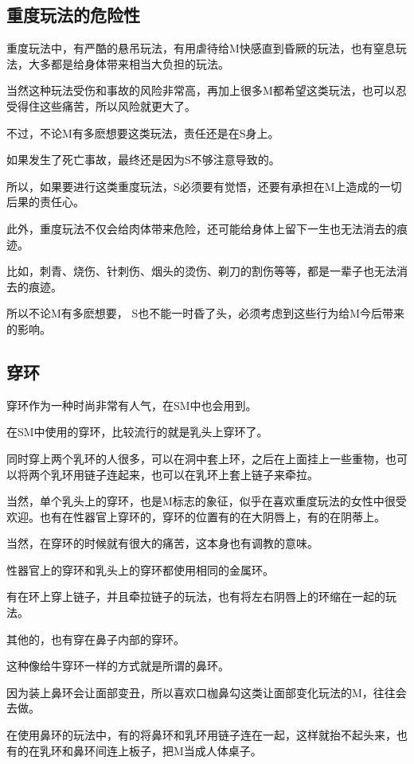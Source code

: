 \documentclass[12pt,UTF8]{ctexbook}
\begin{document}
\subsection{重度玩法的危险性}

重度玩法中，有严酷的悬吊玩法，有用虐待给M快感直到昏厥的玩法，也有窒息玩法，大多都是给身体带来相当大负担的玩法。

当然这种玩法受伤和事故的风险非常高，再加上很多M都希望这类玩法，也可以忍受得住这些痛苦，所以风险就更大了。

不过，不论M有多麽想要这类玩法，责任还是在S身上。

如果发生了死亡事故，最终还是因为S不够注意导致的。

所以，如果要进行这类重度玩法，S必须要有觉悟，还要有承担在M上造成的一切后果的责任心。

此外，重度玩法不仅会给肉体带来危险，还可能给身体上留下一生也无法消去的痕迹。

比如，刺青、烧伤、针刺伤、烟头的烫伤、剃刀的割伤等等，都是一辈子也无法消去的痕迹。

所以不论M有多麽想要， S也不能一时昏了头，必须考虑到这些行为给M今后带来的影响。

\subsection{穿环}

穿环作为一种时尚非常有人气，在SM中也会用到。

在SM中使用的穿环，比较流行的就是乳头上穿环了。

同时穿上两个乳环的人很多，可以在洞中套上环，之后在上面挂上一些重物，也可以将两个乳环用链子连起来，也可以在乳环上套上链子来牵拉。

当然，单个乳头上的穿环，也是M标志的象征，似乎在喜欢重度玩法的女性中很受欢迎。也有在性器官上穿环的，穿环的位置有的在大阴唇上，有的在阴蒂上。

当然，在穿环的时候就有很大的痛苦，这本身也有调教的意味。

性器官上的穿环和乳头上的穿环都使用相同的金属环。

有在环上穿上链子，并且牵拉链子的玩法，也有将左右阴唇上的环缩在一起的玩法。

其他的，也有穿在鼻子内部的穿环。

这种像给牛穿环一样的方式就是所谓的鼻环。

因为装上鼻环会让面部变丑，所以喜欢口枷鼻勾这类让面部变化玩法的M，往往会去做。

在使用鼻环的玩法中，有的将鼻环和乳环用链子连在一起，这样就抬不起头来，也有的在乳环和鼻环间连上板子，把M当成人体桌子。
\end{document}

